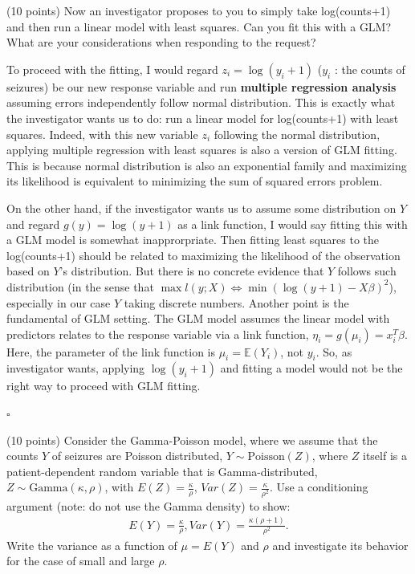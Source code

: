 \documentclass[11pt]{article}
\newcommand{\E}{\mathbb{E}}
\newcommand{\0}{{\mathbf{0}}}
\newcommand{\1}{{\mathbf{1}}}
\newcommand{\pr}[1]{\noindent{\bf #1.}}
\newcommand{\so}{\noindent{\textsc{Solution.\;\;}}}
\newcommand{\ed}{\hfill$\square$}
\begin{document}
\pr{7} (10 points) Now an investigator proposes to you to simply take log(counts+1) and then run a linear model with least squares. Can you fit this with a GLM? What are your considerations when responding to the request?

\so

To proceed with the fitting, I would regard $z_i = \log(y_i + 1)$ ($y_i$ : the counts of seizures) be our new response variable and run \textbf{multiple regression analysis} assuming errors independently follow normal distribution. This is exactly what the investigator wants us to do: run a linear model for log(counts+1) with least squares. Indeed, with this new variable $z_i$ following the normal distribution, applying multiple regression with least squares is also a version of GLM fitting. This is because normal distribution is also an exponential family and maximizing its likelihood is equivalent to minimizing the sum of squared errors problem.

On the other hand, if the investigator wants us to assume some distribution on $Y$ and regard $g(y) = \log(y+1)$ as a link function, I would say fitting this with a GLM model is somewhat inapprorpriate. Then fitting least squares to the log(counts+1) should be related to maximizing the likelihood of the observation based on $Y$'s distribution. But there is no concrete evidence that $Y$ follows such distribution (in the sense that $\max l(y;X) \Leftrightarrow \min (\log(y+1)-X\beta)^2$), especially in our case $Y$ taking discrete numbers. Another point is the fundamental of GLM setting. The GLM model assumes the linear model with predictors relates to the response variable via a link function, $\eta_i = g(\mu_i) = x_i^T\beta$. Here, the parameter of the link function is $\mu_i = \E(Y_i)$, not $y_i$. So, as investigator wants, applying $\log(y_i + 1)$ and fitting a model would not be the right way to proceed with GLM fitting.

\ed

\pr{8} (10 points) Consider the Gamma-Poisson model, where we assume that the counts $Y$ of seizures are Poisson distributed, $Y\sim \text{Poisson}(Z)$, where $Z$ itself is a patient-dependent random variable that is Gamma-distributed, $Z\sim \text{Gamma}(\kappa,\rho)$, with $E(Z)=\frac{\kappa}{\rho}$, $Var(Z)=\frac{\kappa}{\rho^2}$. Use a conditioning argument (note: do not use the Gamma density) to show:
\begin{align*}
E(Y)=\frac{\kappa}{\rho}, Var(Y)=\frac{\kappa(\rho+1)}{\rho^2}.
\end{align*}
Write the variance as a function of $\mu = E(Y)$ and $\rho$ and investigate its behavior for the case of small and large $\rho$.
\end{document}
